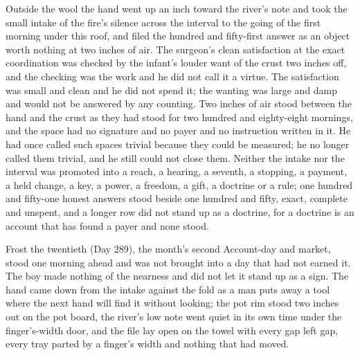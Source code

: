 Outside the wool the hand went up an inch toward the river's note and took the small intake of the fire's silence across the interval to the going of the first morning under this roof, and filed the hundred and fifty-first answer as an object worth nothing at two inches of air. The surgeon's clean satisfaction at the exact coordination was checked by the infant's louder want of the crust two inches off, and the checking was the work and he did not call it a virtue. The satisfaction was small and clean and he did not spend it; the wanting was large and damp and would not be answered by any counting. Two inches of air stood between the hand and the crust as they had stood for two hundred and eighty-eight mornings, and the space had no signature and no payer and no instruction written in it. He had once called such spaces trivial because they could be measured; he no longer called them trivial, and he still could not close them. Neither the intake nor the interval was promoted into a reach, a hearing, a seventh, a stopping, a payment, a held change, a key, a power, a freedom, a gift, a doctrine or a rule; one hundred and fifty-one honest answers stood beside one hundred and fifty, exact, complete and unspent, and a longer row did not stand up as a doctrine, for a doctrine is an account that has found a payer and none stood.

Frost the twentieth (Day 289), the month's second Account-day and market, stood one morning ahead and was not brought into a day that had not earned it. The boy made nothing of the nearness and did not let it stand up as a sign. The hand came down from the intake against the fold as a man puts away a tool where the next hand will find it without looking; the pot rim stood two inches out on the pot board, the river's low note went quiet in its own time under the finger's-width door, and the file lay open on the towel with every gap left gap, every tray parted by a finger's width and nothing that had moved.

